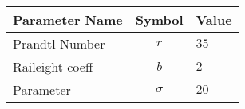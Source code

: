 \begin{tabular}{lcl}
\hline
 Parameter Name   &  Symbol  & Value   \\
\hline
 Prandtl Number   &   $r$    & $35$    \\
 Raileight coeff  &   $b$    & $2$     \\
 Parameter        & $\sigma$ & $20$    \\
\hline
\end{tabular}